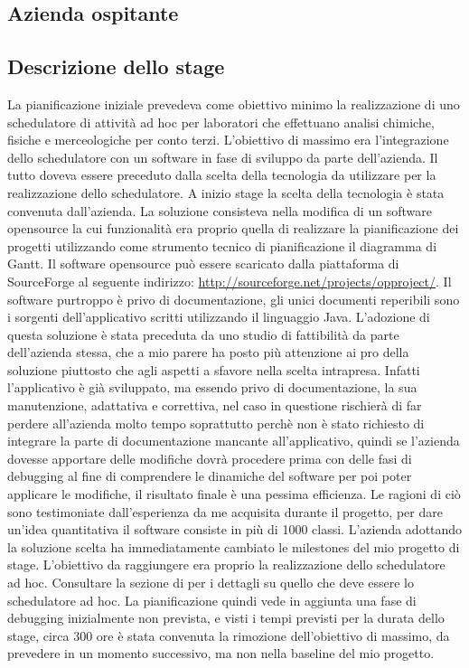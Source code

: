 \subsection{Azienda ospitante}

\subsection{Descrizione dello stage}
La pianificazione iniziale prevedeva come obiettivo minimo la realizzazione di uno schedulatore di attivit\`{a} ad hoc per laboratori che effettuano analisi chimiche, fisiche e merceologiche per conto terzi. L\textquoteright{}obiettivo di massimo era l\textquoteright{}integrazione dello schedulatore con un software in fase di sviluppo da parte dell\textquoteright{}azienda. Il tutto doveva essere preceduto dalla scelta della tecnologia da utilizzare per la realizzazione dello schedulatore.
A inizio stage la scelta della tecnologia \`{e} stata convenuta dall\textquoteright{}azienda. La soluzione consisteva nella modifica di un software opensource la cui funzionalit\`{a} era proprio quella di realizzare la pianificazione dei progetti utilizzando come strumento tecnico di pianificazione il diagramma di Gantt. Il software opensource pu\`{o} essere scaricato dalla piattaforma di SourceForge al seguente indirizzo: \url{http://sourceforge.net/projects/opproject/}.
Il software purtroppo \`{e} privo di documentazione, gli unici documenti reperibili sono i sorgenti dell\textquoteright{}applicativo scritti utilizzando il linguaggio Java. L\textquoteright{}adozione di questa soluzione \`{e} stata preceduta da uno studio di fattibilit\`{a} da parte dell\textquoteright{}azienda stessa, che a mio parere ha posto pi\`{u} attenzione ai pro della soluzione piuttosto che agli aspetti a sfavore nella scelta intrapresa. Infatti l\textquoteright{}applicativo \`{e} gi\`{a} sviluppato, ma essendo privo di documentazione, la sua manutenzione, adattativa e correttiva, nel caso in questione rischier\`{a} di far perdere all\textquoteright{}azienda molto tempo soprattutto perch\`{e} non \`{e} stato richiesto di integrare la parte di documentazione mancante all\textquoteright{}applicativo, quindi se l\textquoteright{}azienda dovesse apportare delle modifiche dovr\`{a} procedere prima con delle fasi di debugging al fine di comprendere le dinamiche del software per poi poter applicare le modifiche, il risultato finale \`{e} una pessima efficienza. Le ragioni di ci\`{o} sono testimoniate dall\textquoteright{}esperienza da me acquisita durante il progetto, per dare un\textquoteright{}idea quantitativa il software consiste in pi\`{u} di 1000 classi.
L\textquoteright{}azienda adottando la soluzione scelta ha immediatamente cambiato le milestones del mio progetto di stage. L\textquoteright{}obiettivo da raggiungere era proprio la realizzazione dello schedulatore ad hoc. Consultare la sezione di  per i dettagli su quello che deve essere lo schedulatore ad hoc. La pianificazione quindi vede in aggiunta una fase di debugging inizialmente non prevista, e visti i tempi previsti per la durata dello stage, circa 300 ore \`{e} stata convenuta la rimozione dell\textquoteright{}obiettivo di massimo, da prevedere in un momento successivo, ma non nella baseline del mio progetto.

